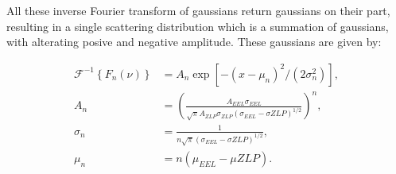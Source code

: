 All these inverse Fourier transform of gaussians return gaussians on their part, resulting in a single scattering distribution which is a summation of gaussians, with alterating posive and negative amplitude. These gaussians are given by:

\begin{equation}
\begin{aligned}
\mathcal{F}^{-1}\left\{ F_n(\nu) \right\} &= A_n \exp{[-(x-\mu_n)^2/(2\sigma_n^2)]}, \\
A_n &= \left( \frac{ A_{EEL} \sigma_{EEL} }{\sqrt{\pi}A_{ZLP} \sigma_{ZLP} (\sigma_{EEL} - \sigma{ZLP})^{1/2} }\right)^n, \\
\sigma_n &= \frac{1}{n\sqrt{\pi}(\sigma_{EEL} - \sigma{ZLP})^{1/2}},\\
\mu_n &= n(\mu_{EEL}-\mu{ZLP}).
\end{aligned}
\end{equation}







